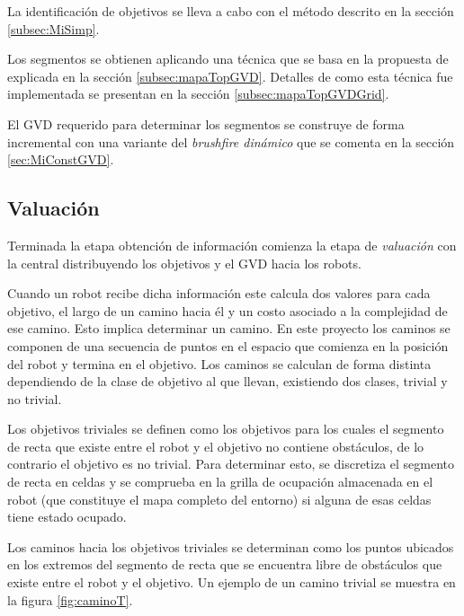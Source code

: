 La identificación de objetivos se lleva a cabo con el método descrito en la
sección \ref{subsec:MiSimp}.

Los segmentos se obtienen aplicando una técnica que se basa en la propuesta de
\cite{Thrun1998} explicada en la sección \ref{subsec:mapaTopGVD}. Detalles de
como esta técnica fue implementada se presentan en la sección
\ref{subsec:mapaTopGVDGrid}. 

El GVD requerido para determinar los segmentos se construye de forma
incremental con una variante del \emph{brushfire dinámico} que se comenta en la
sección \ref{sec:MiConstGVD}.

\subsection{Valuación} \label{subsec:MiValSub}

Terminada la etapa obtención de información comienza la etapa de \emph{valuación} con la
central distribuyendo los objetivos y el GVD hacia los robots. 

Cuando un robot recibe dicha información este calcula dos valores para cada
objetivo, el largo de un camino hacia él y un costo asociado a la complejidad
de ese camino. Esto implica determinar un camino. En este proyecto los caminos
se componen de una secuencia de puntos en el espacio que comienza en la
posición del robot y termina en el objetivo. Los caminos se calculan de forma
distinta dependiendo de la clase de objetivo al que llevan, existiendo dos
clases, trivial y no trivial.

Los objetivos triviales se definen como los objetivos para los cuales el
segmento de recta que existe entre el robot y el objetivo no contiene
obstáculos, de lo contrario el objetivo es no trivial. Para determinar esto, se
discretiza el segmento de recta en celdas \cite{foleyphillips} y se comprueba
en la grilla de ocupación almacenada en el robot (que constituye el mapa
completo del entorno) si alguna de esas celdas tiene estado ocupado. 

Los caminos hacia los objetivos triviales se determinan como los puntos
ubicados en los extremos del segmento de recta que se encuentra libre de
obstáculos que existe entre el robot y el objetivo. Un ejemplo de un camino
trivial se muestra en la figura \ref{fig:caminoT}.

